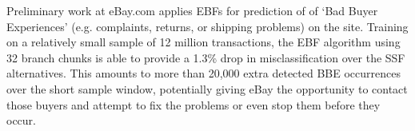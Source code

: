 \documentclass{article}
\begin{document}
Preliminary work at eBay.com applies EBFs for prediction of of `Bad Buyer Experiences' (e.g. complaints, returns, or shipping problems) on the site.  Training on a relatively small sample of 12 million transactions, the EBF algorithm using 32 branch chunks is able to provide a 1.3\% drop in misclassification over the SSF alternatives.  This amounts to more than 20,000 extra detected BBE occurrences over the short sample window, potentially giving eBay the opportunity to contact those buyers and attempt to fix the problems or even stop them before they occur.



\end{document}
